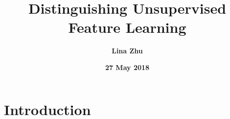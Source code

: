 \documentclass[a4paper,18pt]{article}
\begin{document}
\twocolumn
%
 \title{\textbf{\bfseries \LARGE Distinguishing Unsupervised Feature Learning} }
\author{\textbf{Lina Zhu}}
\date{\textbf{27 May 2018}}
\maketitle
\section{Introduction}
\end{document}
